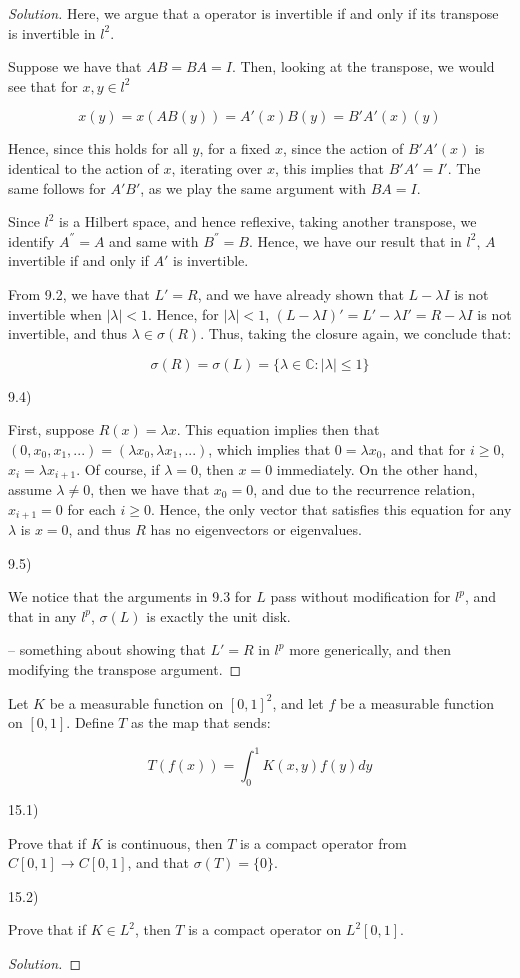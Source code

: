 \documentclass[10pt]{article}
\newenvironment{problem}[2][]{\begin{trivlist}
\item[\hskip \labelsep {\bfseries #1}\hskip \labelsep {\bfseries #2.}]}{\end{trivlist}}
\begin{document}
\begin{proof}[Solution]
Here, we argue that a operator is invertible if and only if its transpose is invertible in $l^2$.

Suppose we have that $AB = BA = I$. Then, looking at the transpose, we would see that for $x, y \in l^2$

$$x(y) =  x (AB(y)) = A'(x) B(y)  = B'A'(x) (y)$$

Hence, since this holds for all $y$, for a fixed $x$, since the action of $B'A'(x)$ is identical to the action of $x$, iterating over $x$, this implies that $B' A' = I'$. The same follows for $A'B'$, as we play the same argument with $BA = I$.

Since $l^2$ is a Hilbert space, and hence reflexive, taking another transpose, we identify $A^{ ''} = A$ and same with $B^{''} = B$. Hence, we have our result that in $l^2$, $A$ invertible if and only if $A'$ is invertible.

From 9.2, we have that $L' = R$, and we have already shown that $L - \lambda I$ is not invertible when $| \lambda| < 1$. Hence, for $| \lambda| < 1$, $(L - \lambda I )' = L' - \lambda I' = R - \lambda I$ is not invertible, and thus $\lambda \in \sigma(R)$. Thus, taking the closure again, we conclude that:

$$\sigma(R) = \sigma(L) =  \{ \lambda \in \mathbb{C} : |\lambda | \leq 1 \}$$


9.4)

First, suppose $R(x) =\lambda x$. This equation implies then that $(0,x_0,x_1,...) = (\lambda x_0, \lambda x_1,...)$, which implies that $0 =\lambda  x_0$, and that for $ i \geq 0$, $x_i = \lambda x_{i+1}$. Of course, if $\lambda = 0$, then $x = 0$ immediately. On the other hand, assume $\lambda \not = 0$, then we have that $x_0 = 0$, and due to the recurrence relation, $x_{i+1} = 0$ for each $i \geq 0$. Hence, the only vector that satisfies this equation for any $\lambda$ is $x = 0$, and thus $R$ has no eigenvectors or eigenvalues.

9.5)

We notice that the arguments in 9.3 for $L$ pass without modification for $l^p$, and that in any $l^p$, $\sigma(L)$ is exactly the unit disk.

-- something about showing that $L' = R$ in $l^p$ more generically, and then modifying the transpose argument.

\end{proof}


\begin{problem}{Question 15}

Let $K$ be a measurable function on $[0,1]^2$, and let $f$ be a measurable function on $[0,1]$. Define $T$ as the map that sends:

$$ T(f(x)) = \int_0^1 K(x,y)f(y) dy $$

15.1)

Prove that if $K$ is continuous, then $T$ is a compact operator from $C[0,1] \to C[0,1]$, and that $\sigma(T) = \{ 0 \}$.

15.2)

Prove that if $K \in L^2$, then $T$ is a compact operator on $L^2[0,1]$.

\end{problem}

\begin{proof}[Solution]


\end{proof}
\end{document}
